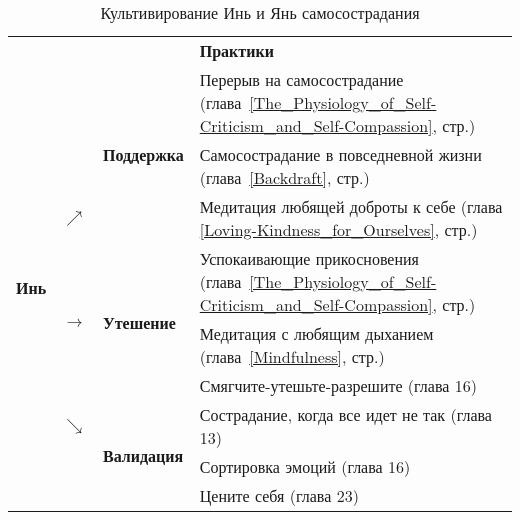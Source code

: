 \begin{table}[!h]
	\begin{center}
		\caption{Культивирование Инь и Янь самосострадания}\label{tab:Yin_and_Yang}
		\setlength{\extrarowheight}{1mm}
		\begin{tabular}{p{1.2cm}p{3mm}p{2.6cm}||p{9.9cm}}
			\multicolumn{3}{r}{ } & {\large \textbf{Практики}}\\[1mm]
			\cline{3-4}
			\multirow{9}{*}{{\LARGE\textbf{Инь}}} &  & \multirow{3}{*}{\textbf{Поддержка}} & {\small Перерыв на самосострадание (глава~\ref{The_Physiology_of_Self-Criticism_and_Self-Compassion}, стр.\:\pageref{IP:Self-Compassion_Break})}\\ 
			&  &  & {\small Самосострадание в повседневной жизни (глава~\ref{Backdraft}, стр.\:\pageref{IP:Self-Compassion_in_Daily_Life})}\\ 
			& $\nearrow$ &  &{\small  Медитация любящей доброты к себе (глава \ref{Loving-Kindness_for_Ourselves}, стр.\:\pageref{M:Loving-Kindness_for_Ourselves})}\\ \cline{3-4}
			& \multirow{3}{*}{\textbf{$\rightarrow$}} & \multirow{3}{*}{\textbf{Утешение}} & {\small Успокаивающие прикосновения (глава~\ref{The_Physiology_of_Self-Criticism_and_Self-Compassion}, стр.\:\pageref{IP:Soothing_Touch})}\\
			&   &   & {\small Медитация с любящим дыханием (глава~\ref{Mindfulness}, стр.\:\pageref{medit:Affectionate_Breathing})}\\
			&   &   & {\small Смягчите-утешьте-разрешите (глава 16)}\\ \cline{3-4}
			& $\searrow$ & \multirow{3}{*}{\textbf{Валидация}} &{\small  Сострадание, когда все идет не так (глава 13)}\\
			&   &   & {\small Сортировка эмоций (глава 16)}\\
			&   &   & {\small Цените себя (глава 23)}\\ \cline{3-4}
		\end{tabular}
		\setlength{\extrarowheight}{0mm}
	\end{center}
\end{table} 
